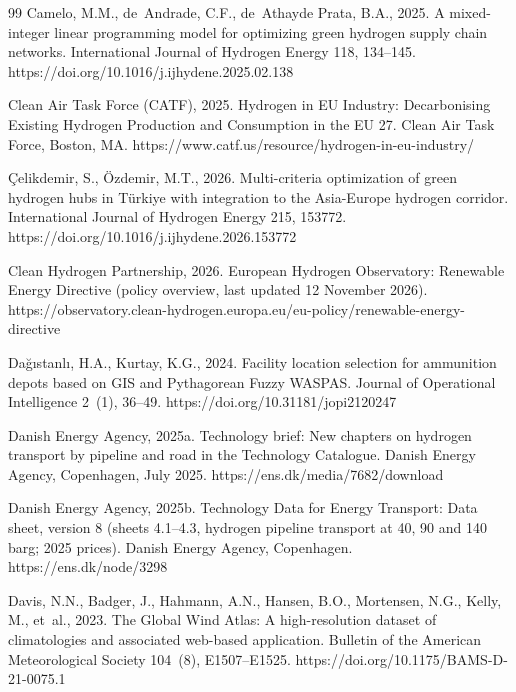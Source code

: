 \documentclass[preprint,12pt,authoryear]{elsarticle}
\begin{document}
\begin{thebibliography}{99}
Camelo, M.M., de~Andrade, C.F., de~Athayde Prata, B.A., 2025. A mixed-integer linear programming model for optimizing green hydrogen supply chain networks. International Journal of Hydrogen Energy 118, 134--145. https://doi.org/10.1016/j.ijhydene.2025.02.138

Clean Air Task Force (CATF), 2025. Hydrogen in EU Industry: Decarbonising Existing Hydrogen Production and Consumption in the EU 27. Clean Air Task Force, Boston, MA. https://www.catf.us/resource/hydrogen-in-eu-industry/

Çelikdemir, S., Özdemir, M.T., 2026. Multi-criteria optimization of green hydrogen hubs in T{\"u}rkiye with integration to the Asia-Europe hydrogen corridor. International Journal of Hydrogen Energy 215, 153772. https://doi.org/10.1016/j.ijhydene.2026.153772

Clean Hydrogen Partnership, 2026. European Hydrogen Observatory: Renewable Energy Directive (policy overview, last updated 12 November 2026). https://observatory.clean-hydrogen.europa.eu/eu-policy/renewable-energy-directive

Da{\u{g}}{\i}stanl{\i}, H.A., Kurtay, K.G., 2024. Facility location selection for ammunition depots based on GIS and Pythagorean Fuzzy WASPAS. Journal of Operational Intelligence 2~(1), 36--49. https://doi.org/10.31181/jopi2120247

Danish Energy Agency, 2025a. Technology brief: New chapters on hydrogen transport by pipeline and road in the Technology Catalogue. Danish Energy Agency, Copenhagen, July 2025. https://ens.dk/media/7682/download

Danish Energy Agency, 2025b. Technology Data for Energy Transport: Data sheet, version 8 (sheets 4.1--4.3, hydrogen pipeline transport at 40, 90 and 140 barg; 2025 prices). Danish Energy Agency, Copenhagen. https://ens.dk/node/3298

Davis, N.N., Badger, J., Hahmann, A.N., Hansen, B.O., Mortensen, N.G., Kelly, M., et~al., 2023. The Global Wind Atlas: A high-resolution dataset of climatologies and associated web-based application. Bulletin of the American Meteorological Society 104~(8), E1507--E1525. https://doi.org/10.1175/BAMS-D-21-0075.1


\end{thebibliography}
\end{document}
